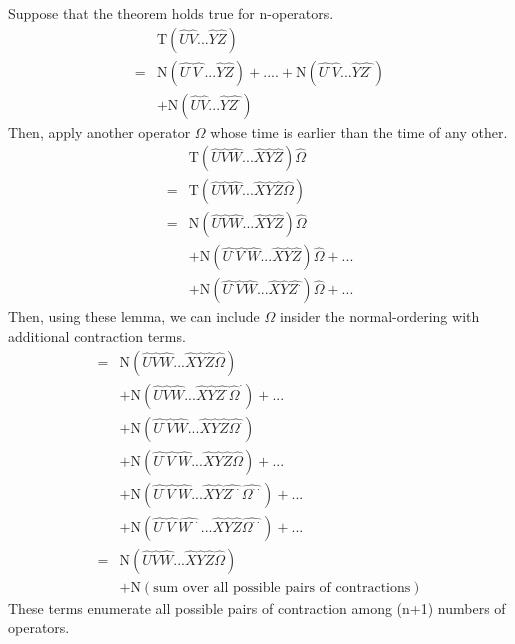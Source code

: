 Suppose that the theorem holds true for n-operators.
\begin{align}
&\mathrm{T}(\hat{U}\hat{V}...\hat{Y}\hat{Z}) \nonumber \\
=&\mathrm{N}(\hat{U^{\cdot}}\hat{V^{\cdot}}...\hat{Y}\hat{Z})+....+\mathrm{N}(\hat{U^{\cdot}}\hat{V}...\hat{Y}\hat{Z^{\cdot}})\nonumber \\
&+\mathrm{N}(\hat{U}\hat{V}...\hat{Y}\hat{Z^{\cdot}})\nonumber
\end{align}
Then, apply another operator $\Omega$ whose time is earlier than the time of any other.
\begin{align}
&\mathrm{T}(\hat{U}\hat{V}\hat{W}...\hat{X}\hat{Y}\hat{Z})\hat{\Omega} \nonumber \\
=&\mathrm{T}(\hat{U}\hat{V}\hat{W}...\hat{X}\hat{Y}\hat{Z}\hat{\Omega}) \nonumber \\
=&\mathrm{N}(\hat{U}\hat{V}\hat{W}...\hat{X}\hat{Y}\hat{Z})\hat{\Omega}\nonumber \\
&+\mathrm{N}(\hat{U^{\cdot}}\hat{V^{\cdot}}\hat{W}...\hat{X}\hat{Y}\hat{Z})\hat{\Omega}+...\nonumber \\
&+\mathrm{N}(\hat{U^{\cdot}}\hat{V}\hat{W}...\hat{X}\hat{Y}\hat{Z^{\cdot}})\hat{\Omega}+...\nonumber
\end{align}
Then, using these lemma, we can include $\Omega$ insider the normal-ordering with additional contraction terms.
\begin{align}
=&\mathrm{N}(\hat{U}\hat{V}\hat{W}...\hat{X}\hat{Y}\hat{Z}\hat{\Omega})\nonumber \\
&+\mathrm{N}(\hat{U}\hat{V}\hat{W}...\hat{X}\hat{Y}\hat{Z^{\cdot}}\hat{\Omega}^{\cdot})+...\nonumber \\
&+\mathrm{N}(\hat{U^{\cdot}}\hat{V}\hat{W}...\hat{X}\hat{Y}\hat{Z}\hat{\Omega^{\cdot}})\nonumber \\
&+\mathrm{N}(\hat{U^{\cdot}}\hat{V^{\cdot}}\hat{W}...\hat{X}\hat{Y}\hat{Z}\hat{\Omega})+...\nonumber \\
&+\mathrm{N}(\hat{U^{\cdot}}\hat{V^{\cdot}}\hat{W}...\hat{X}\hat{Y}\hat{Z^{\cdot\cdot}}\hat{\Omega^{\cdot\cdot}})+...\nonumber \\
&+\mathrm{N}(\hat{U^{\cdot}}\hat{V^{\cdot}}\hat{W^{\cdot\cdot}}...\hat{X}\hat{Y}\hat{Z}\hat{\Omega^{\cdot\cdot}})+...\nonumber \\
=&\mathrm{N}(\hat{U}\hat{V}\hat{W}...\hat{X}\hat{Y}\hat{Z}\hat{\Omega})\nonumber \\
&+\mathrm{N}(\text{sum over all possible pairs of contractions})\nonumber 
\end{align}
These terms enumerate all possible pairs of contraction among (n+1) numbers of operators.


